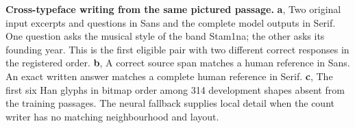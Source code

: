 \textbf{Cross-typeface writing from the same pictured passage.}
\textbf{a}, Two original input excerpts and questions in Sans and the complete
model outputs in Serif. One question asks the musical style of the band
Stam1na; the other asks its founding year. This is the first eligible pair
with two different correct responses in the registered order.
\textbf{b}, A correct source span matches a human reference in Sans.
An exact written answer matches a complete human reference in Serif.
\textbf{c}, The first six Han glyphs in bitmap order among 314 development
shapes absent from the training passages. The neural fallback supplies local
detail when the count writer has no matching neighbourhood and layout.
